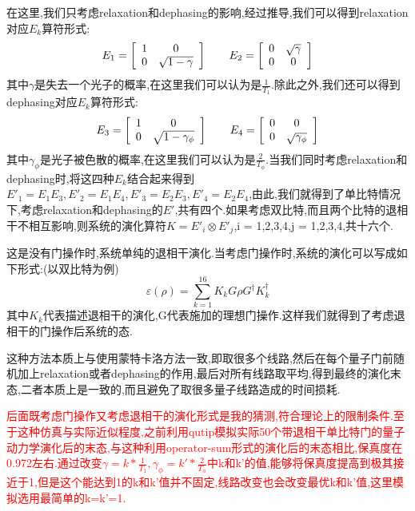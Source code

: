 在这里,我们只考虑relaxation和dephasing的影响,经过推导,我们可以得到relaxation对应$E_{k}$算符形式:
\begin{equation}
\centering 
E_{1}=\left[
\begin{array}{cc}  
1 & 0 \\ 
0 & \sqrt{1-\gamma} 
\end{array}
\right ]\quad\quad
E_{2}=\left[
\begin{array}{cc}  
0 & \sqrt{\gamma} \\ 
0 & 0 
\end{array}
\right ]		
\end{equation}
其中$\gamma$是失去一个光子的概率,在这里我们可以认为是$\frac{1}{T_{1}}$.除此之外,我们还可以得到dephasing对应$E_{k}$算符形式:
\begin{equation}
\centering 
E_{3}=\left[
\begin{array}{cc}  
1 & 0 \\ 
0 & \sqrt{1-\gamma_{\phi}} 
\end{array}
\right ]\quad\quad
E_{4}=\left[
\begin{array}{cc}  
0 & 0 \\ 
0 & \sqrt{\gamma_{\phi} }
\end{array}
\right ]		
\end{equation}
其中$\gamma_{\phi}$是光子被色散的概率,在这里我们可以认为是$\frac{2}{T_{\phi}}$.当我们同时考虑relaxation和dephasing时,将这四种$E_{k}$结合起来得到$E'_{1}=E_{1}E_{3}, E'_{2}=E_{1}E_{4}, E'_{3}=E_{2}E_{3}, E'_{4}=E_{2}E_{4}$,由此,我们就得到了单比特情况下,考虑relaxation和dephasing的$E'$,共有四个.如果考虑双比特,而且两个比特的退相干不相互影响,则系统的演化算符$K=E'_{i}\otimes E'_{j}$,i = 1,2,3,4,j = 1,2,3,4,共十六个.

这是没有门操作时,系统单纯的退相干演化.当考虑门操作时,系统的演化可以写成如下形式:(以双比特为例)
\begin{equation}
\varepsilon(\rho) = \sum_{k=1}^{16}K_{k} G\rho G^{\dagger} K^{\dagger}_{k}
\end{equation}
其中$K_{k}$代表描述退相干的演化,G代表施加的理想门操作.这样我们就得到了考虑退相干的门操作后系统的态.

这种方法本质上与使用蒙特卡洛方法一致,即取很多个线路,然后在每个量子门前随机加上relaxation或者dephasing的作用,最后对所有线路取平均,得到最终的演化末态,二者本质上是一致的,而且避免了取很多量子线路造成的时间损耗.

\textcolor{red}{后面既考虑门操作又考虑退相干的演化形式是我的猜测,符合理论上的限制条件.至于这种仿真与实际近似程度,之前利用qutip模拟实际50个带退相干单比特门的量子动力学演化后的末态,与这种利用operator-sum形式的演化后的末态相比,保真度在0.972左右.通过改变$\gamma = k*\frac{1}{T_{1}},\gamma_{\phi}=k'*\frac{2}{T_{\phi}}$中k和k'的值,能够将保真度提高到极其接近于1,但是这个能达到1的k和k'值并不固定,线路改变也会改变最优k和k'值,这里模拟选用最简单的k=k'=1.}
